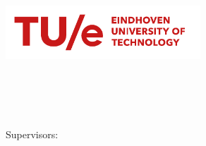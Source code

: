 \begin{titlepage}
    \begin{center}
        \includegraphics[height=2cm]{figures/TUe-logo-descriptor-line-scarlet-rgb}\\
        \large
        \mbox{}\department\\\mbox{}\group

        \vspace{1.6cm}

        \setlength{\TPHorizModule}{1mm}
        \setlength{\TPVertModule}{\TPHorizModule}
        \newlength{\backupparindent}
        \setlength{\backupparindent}{\parindent}
        \setlength{\parindent}{0mm}
        \vspace*{1mm}
        \huge
        \textbf{\doctitle \\}
        \Large
        \vspace*{5mm}
        \textit{\docsubtitle}\\
        \vspace*{10mm}
        \Large
        \me\\

        \large
        Supervisors:\\
        \mbox{}\firstCommitteeMember  \\
        \mbox{}\secondCommitteeMember \\
        \mbox{}\thirdCommitteeMember  \\

        \vfill
        \version

        \vfill
        \large
        \placeMonthYear\\

        \setlength{\parindent}{\backupparindent}
    \end{center}
\end{titlepage}
\normalsize
